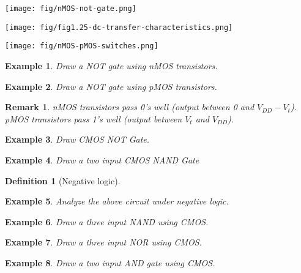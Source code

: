 \documentclass{article}
\newtheorem{example}{Example}
\newtheorem{remark}{Remark}
\newtheorem{definition}{Definition}
\begin{document}
\texttt{[image: fig/nMOS-not-gate.png]}

\texttt{[image: fig/fig1.25-dc-transfer-characteristics.png]}

\texttt{[image: fig/nMOS-pMOS-switches.png]}


\begin{example}
  Draw a NOT gate using nMOS transistors.
\end{example}
\vspace{10em}

\begin{example}
  Draw a NOT gate using pMOS transistors.
\end{example}
\vspace{10em}

\begin{remark}
  nMOS transistors pass 0's well (output between 0 and $V_{DD} - V_t$). pMOS
  transistors pass 1's well (output between $V_t$ and $V_{DD}$).
\end{remark}
\begin{example}
Draw CMOS NOT Gate.
\end{example}
\vspace{10em}

\begin{example}
Draw a two input CMOS NAND Gate
\end{example}
\vspace{10em}


\begin{definition}[Negative logic]
\end{definition}
\vspace{5em}

\begin{example}
  Analyze the above circuit under negative logic.
\end{example}
\vspace{10em}



\begin{example}
Draw a three input NAND using CMOS.
\end{example}
\vspace{10em}


\begin{example}
Draw a three input NOR using CMOS.
\end{example}
\vspace{10em}

\begin{example}
  Draw a two input AND gate using CMOS.
\end{example}
\vspace{10em}
\end{document}
